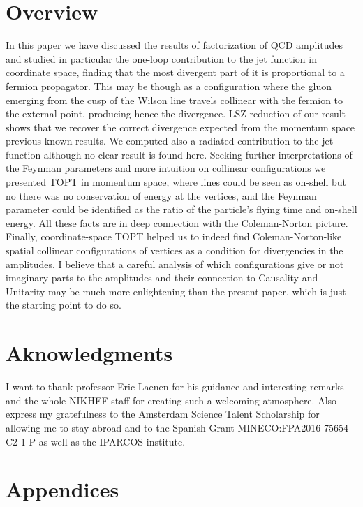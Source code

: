 \documentclass[%
 reprint,
 amsmath,amssymb,
 aps,
]{revtex4-1}
\begin{document}
 \section{Overview}
In this paper we have discussed the results of factorization of QCD amplitudes and studied in particular the one-loop contribution to the jet function in coordinate space, finding that the most divergent part of it is proportional to a fermion propagator. This may be though as a configuration where the gluon emerging from the cusp of the Wilson line travels collinear with the fermion to the external point, producing hence the divergence. LSZ reduction of our result shows that we recover the correct divergence expected from the momentum space previous known results. We computed also a radiated contribution to the jet-function although no clear result is found here. Seeking further interpretations of the Feynman parameters and more intuition on collinear configurations we presented TOPT in momentum space, where lines could be seen as on-shell but no there was no conservation of energy at the vertices, and the Feynman parameter could be identified as the ratio of the particle's flying time and on-shell energy. All these facts are in deep connection with the Coleman-Norton picture. Finally, coordinate-space TOPT helped us to indeed find Coleman-Norton-like spatial collinear configurations of vertices as a condition for divergencies in the amplitudes. I believe that a careful analysis of which configurations give or not imaginary parts to the amplitudes and their connection to Causality and Unitarity may be much more enlightening than the present paper, which is just the starting point to do so. \\


\section{Aknowledgments}

I want to thank professor Eric Laenen for his guidance and interesting remarks and the whole NIKHEF staff for creating such a welcoming atmosphere. Also express my gratefulness to the Amsterdam Science Talent Scholarship for allowing me to stay abroad and to the Spanish Grant MINECO:FPA2016-75654-C2-1-P as well as the IPARCOS institute.




\section{Appendices}
\end{document}
